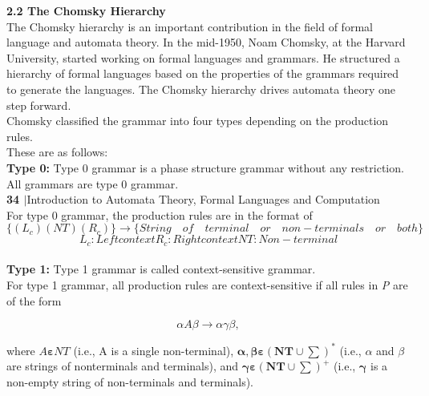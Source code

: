 \documentclass[12pt]{book}
\begin{document}
	
	\textbf{\Large 2.2 The Chomsky Hierarchy}\\
	The Chomsky hierarchy is an important contribution in the field of formal language and automata theory.  
	In the mid-1950, Noam Chomsky, at the Harvard University, started working on formal
	languages and grammars. He structured a hierarchy of formal languages based on the properties of the
	grammars required to generate the languages. The Chomsky hierarchy drives automata theory one step forward.\\
	Chomsky classified the grammar into four types depending on the production rules.\\
	These are as follows:\\
	\textbf{Type 0:} Type 0 grammar is a phase structure grammar without any restriction. All grammars are type 0 grammar.\\




\textbf{34 $\boldsymbol{\mid}$}Introduction to Automata Theory, Formal Languages and Computation\\
For type 0 grammar, the production rules are in the format of\\
\[\{(L_c)(NT)(R_c)\} \rightarrow \{String\quad of\quad terminal\quad or\quad non-terminals\quad or\quad both\}\]
\[L_c: Left context R_c: Right context NT : Non-terminal \]      \\
\textbf{Type 1:} Type 1 grammar is called context-sensitive grammar.\\
For type 1 grammar, all production rules are context-sensitive if all rules in \textit{P} are of the form

\[\alpha A\beta \rightarrow \alpha \gamma \beta ,\]

where $A \boldsymbol{\varepsilon} NT$ (i.e., A is a single non-terminal), $\boldsymbol{\alpha, \beta \varepsilon (NT \cup \sum)^*}$ (i.e., $\alpha $ and $\beta$ are strings of nonterminals and terminals), and $\boldsymbol{\gamma \varepsilon (NT \cup \sum)}^+$ (i.e., $\boldsymbol{\gamma}$ is a non-empty string of non-terminals and
terminals).\\
\end{document}
